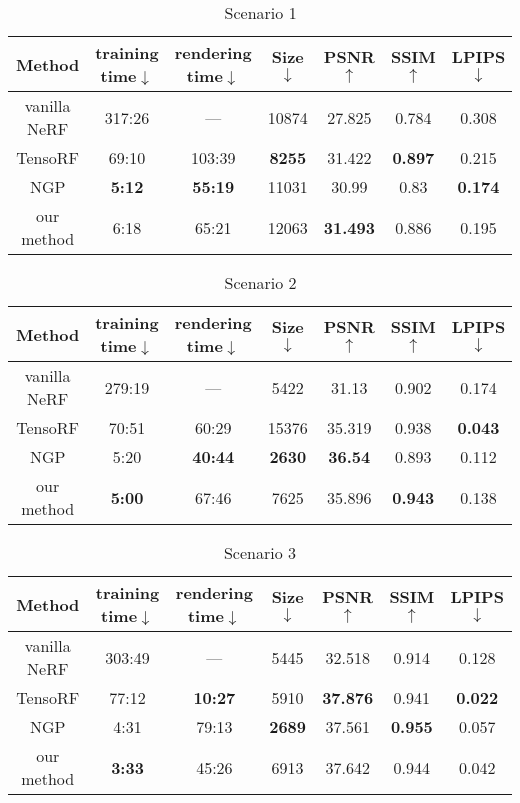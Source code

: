 \begin{table}[htbp]
\centering
\begin{tabular}{|c|c|c|c|c|c|c|}
\hline Method &training time$\downarrow$ & rendering time$\downarrow$  & Size$\downarrow$ & PSNR$\uparrow$ & SSIM$\uparrow$ & LPIPS$\downarrow$ \\
\hline vanilla NeRF\cite{nerf_pytorch} & 317:26 & --- &  10874 & 27.825 & 0.784 & 0.308 \\
\hline TensoRF\cite{TensoRF} & 69:10  & 103:39 & \textbf{8255} & 31.422 & \textbf{0.897} & 0.215 \\
\hline NGP\cite{instant-ngp} & \textbf{5:12} & \textbf{55:19} & 11031 & 30.99 & 0.83 & \textbf{0.174}\\
\hline our method & 6:18 & 65:21 & 12063 & \textbf{31.493} & 0.886 & 0.195 \\
\hline
\end{tabular}
\caption{Scenario 1}
\label{Scenario 1}
\end{table}

\begin{table}[htbp]
\centering
\begin{tabular}{|c|c|c|c|c|c|c|}
\hline Method & training time$\downarrow$ & rendering time$\downarrow$ & Size$\downarrow$ & PSNR$\uparrow$ & SSIM$\uparrow$ & LPIPS$\downarrow$  \\
\hline vanilla NeRF\cite{nerf_pytorch} & 279:19  & --- & 5422 & 31.13 & 0.902 & 0.174 \\
\hline TensoRF\cite{TensoRF} & 70:51 &  60:29  & 15376 & 35.319 & 0.938 & \textbf{0.043} \\
\hline NGP\cite{instant-ngp} & 5:20 & \textbf{40:44} & \textbf{2630} & \textbf{36.54} & 0.893 & 0.112 \\
\hline our method & \textbf{5:00} & 67:46 & 7625 & 35.896 & \textbf{0.943} & 0.138 \\
\hline
\end{tabular}
\caption{Scenario 2}
\label{Scenario 2}
\end{table}

\begin{table}[htbp]
\centering
\begin{tabular}{|c|c|c|c|c|c|c|}
\hline Method & training time$\downarrow$ & rendering time$\downarrow$  & Size$\downarrow$ & PSNR$\uparrow$ & SSIM$\uparrow$ & LPIPS$\downarrow$  \\
\hline vanilla NeRF\cite{nerf_pytorch} & 303:49 & --- & 5445 & 32.518 & 0.914 & 0.128  \\
\hline TensoRF\cite{TensoRF} & 77:12  & \textbf{10:27} & 5910 & \textbf{37.876} & 0.941 & \textbf{0.022}  \\
\hline NGP\cite{instant-ngp} & 4:31  & 79:13 & \textbf{2689} & 37.561 & \textbf{0.955} & 0.057 \\
\hline our method & \textbf{3:33} & 45:26 & 6913 & 37.642 & 0.944  & 0.042  \\
\hline
\end{tabular}
\caption{Scenario 3}
\label{Scenario 3}
\end{table}